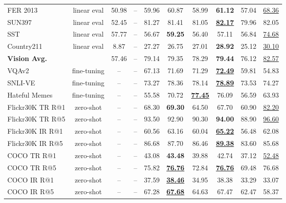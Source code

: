 \documentclass[10pt,twocolumn,letterpaper]{article}
\begin{document}
\begin{table*}[t]
\begin{tabular}{l@{\ }c|ccccccc|c}
FER 2013 \cite{goodfellow2014explaining} & linear eval & 50.98 & -- & 59.96 & 60.87 & 58.99 & \textbf{61.12} & 57.04 & \underline{68.36} \\
SUN397 \cite{xiao2016sun} & linear eval & 52.45 & -- & 81.27 & 81.41 & 81.05 & \underline{\textbf{82.17}} & 79.96 & 82.05 \\
SST \cite{radford2021learning} & linear eval & 57.77 & -- & 56.67 & \textbf{59.25} & 56.40 & 57.11 & 56.84 & \underline{74.68} \\
Country211 \cite{radford2021learning} & linear eval & 8.87 & -- & 27.27 & 26.75 & 27.01 & \textbf{28.92} & 25.12 & \underline{30.10} \\
\midrule 
\textbf{Vision Avg.} &  & 57.46 & -- & 79.14 & 79.35 & 78.29 & \textbf{79.44} & 76.12 & \underline{82.57} \\
\midrule
VQAv2 \cite{goyal2017making} & fine-tuning & -- & -- & 67.13 & 71.69 & 71.29 & \underline{\textbf{72.49}} & 59.81 & 54.83 \\
SNLI-VE \cite{xie2019visual} & fine-tuning & -- & -- & 73.27 & 78.36 & 78.14 & \underline{\textbf{78.89}} & 73.53 & 74.27 \\
Hateful Memes \cite{kiela2020hateful} & fine-tuning & -- & -- & 55.58 & 70.72 & \underline{\textbf{77.45}} & 76.09 & 56.59 & 63.93 \\
Flickr30K \cite{flickr30k} TR R@1 & zero-shot & -- & -- & 68.30 & \textbf{69.30} & 64.50 & 67.70 & 60.90 & \underline{82.20} \\
Flickr30K \cite{flickr30k} TR R@5 & zero-shot & -- & -- & 93.50 & 92.90 & 90.30 & \textbf{94.00} & 88.90 & \underline{96.60} \\
Flickr30K \cite{flickr30k} IR R@1 & zero-shot & -- & -- & 60.56 & 63.16 & 60.04 & \underline{\textbf{65.22}} & 56.48 & 62.08 \\
Flickr30K \cite{flickr30k} IR R@5 & zero-shot & -- & -- & 86.68 & 87.70 & 86.46 & \underline{\textbf{89.38}} & 83.60 & 85.68 \\
COCO \cite{coco} TR R@1 & zero-shot & -- & -- & 43.08 & \textbf{43.48} & 39.88 & 42.74 & 37.12 & \underline{52.48} \\
COCO \cite{coco} TR R@5 & zero-shot & -- & -- & 75.82 & \underline{\textbf{76.76}} & 72.84 & \underline{\textbf{76.76}} & 69.48 & 76.68 \\
COCO \cite{coco} IR R@1 & zero-shot & -- & -- & 37.59 & \underline{\textbf{38.46}} & 34.95 & 38.38 & 33.29 & 33.07 \\
COCO \cite{coco} IR R@5 & zero-shot & -- & -- & 67.28 & \underline{\textbf{67.68}} & 64.63 & 67.47 & 62.47 & 58.37 \\

\end{tabular}
\end{table*}
\end{document}
